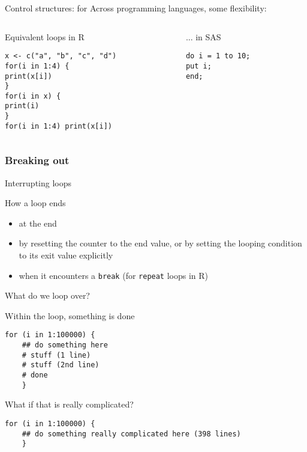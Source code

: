 \documentclass[xcolor=table,compress]{beamer}
\begin{document}
\begin{frame}[fragile]{Control structures: for}
Across programming languages, some flexibility:
\begin{columns}
\begin{column}[t]{.48\textwidth}
\pause
\begin{block}{Equivalent loops in R}
\lstset{language=R}
\begin{lstlisting}
x <- c("a", "b", "c", "d")
for(i in 1:4) {
print(x[i])
}
for(i in x) {
print(i)
}
for(i in 1:4) print(x[i])
\end{lstlisting}
\end{block}
\end{column}
\hfill
\begin{column}[t]{.48\textwidth}
\begin{block}{... in SAS}
\lstset{language=SAS}
\begin{lstlisting}
do i = 1 to 10;
put i;
end;
\end{lstlisting}
\end{block}
\end{column}

\end{columns}
\end{frame}

\subsubsection{Breaking out}
\begin{frame}{Interrupting loops}
\begin{block}{How a loop ends}
\begin{itemize}
\item at the end
\item by resetting the counter to the end value, or by setting the looping condition to its exit value explicitly
\item when it encounters a \texttt{break} (for \texttt{repeat} loops in R)
\end{itemize}
\end{block}
\end{frame}



\begin{frame}[fragile]{What do we loop over?}
\begin{block}{Within the loop, something is done}
\lstset{language=R, basicstyle=\footnotesize}
\begin{lstlisting}
for (i in 1:100000) {
	## do something here 
	# stuff (1 line)
	# stuff (2nd line)
	# done
	}
\end{lstlisting}
\end{block}
\pause
\begin{block}{What if that is really complicated?}
\lstset{language=R, basicstyle=\footnotesize}
\begin{lstlisting}
for (i in 1:100000) {
	## do something really complicated here (398 lines)
	}
\end{lstlisting}
\end{block}
\end{frame}
\end{document}
